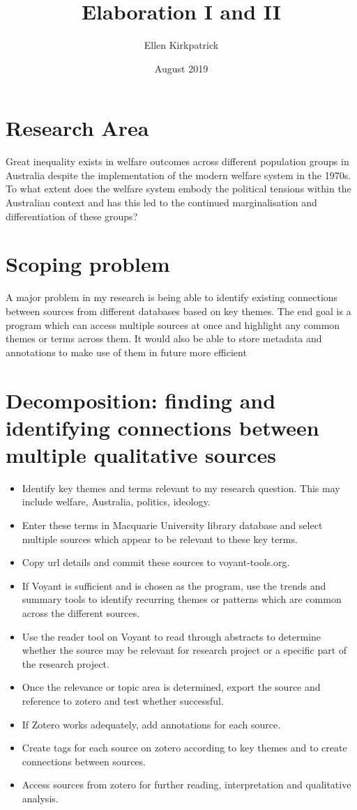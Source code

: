 \documentclass{article}
\title{Elaboration I and II}
\author{Ellen Kirkpatrick }
\date{August 2019}
\begin{document}
\maketitle
\section{Research Area}
Great inequality exists in welfare outcomes across different population groups in Australia despite the implementation of the modern welfare system in the 1970s. To what extent does the welfare system embody the political tensions within the Australian context and has this led to the continued marginalisation and differentiation of these groups?

\section{Scoping problem}
A major problem in my research is being able to identify existing connections between sources from different databases based on key themes. The end goal is a program which can access multiple sources at once and highlight any common themes or terms across them. It would also be able to store metadata and annotations to make use of them in future more efficient

\section{Decomposition: finding and identifying connections between multiple qualitative sources}
\begin{itemize}
    \item Identify key themes and terms relevant to my research question. This may include welfare, Australia, politics, ideology.
    \item Enter these terms in Macquarie University library database and select multiple sources which appear to be relevant to these key terms. 
    \item Copy url details and commit these sources to  voyant-tools.org. 
    \item If Voyant is sufficient and is chosen as the program, use the trends and summary tools to identify recurring themes or patterns which are common across the different sources. 
    \item Use the reader tool on Voyant to read through abstracts to determine whether the source may be relevant for research project or a specific part of the research project.
    \item Once the relevance or topic area is determined, export the source and reference to zotero and test whether successful. 
    \item If Zotero works adequately, add annotations for each source.
    \item Create tags for each source on zotero according to key themes and to create connections between sources.
    \item Access sources from zotero for further reading, interpretation and qualitative analysis. 
\end{itemize}
\end{document}
